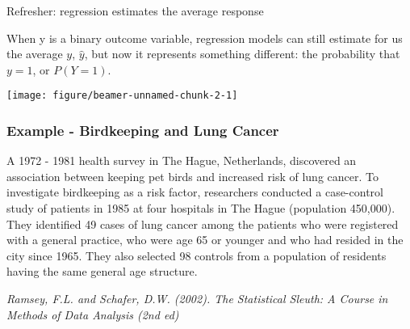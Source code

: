 \documentclass[table]{beamer}\usepackage[]{graphicx}\usepackage[]{color}
\makeatletter
\def\maxwidth{ %
  \ifdim\Gin@nat@width>\linewidth
    \linewidth
  \else
    \Gin@nat@width
  \fi
}
\newenvironment{knitrout}{}{} %
\makeatother
\begin{document}

\begin{frame}[fragile]{Refresher: regression estimates the average response}

When y is a binary outcome variable, regression models can still estimate for us the average $y$, $\hat y$, but now it represents something different: the probability that $y = 1$, or $P(Y=1)$.

\begin{knitrout}\scriptsize
{}\color{fgcolor}

{\centering \texttt{[image: figure/beamer-unnamed-chunk-2-1]} 

}



\end{knitrout}

\end{frame}



\begin{frame}
\frametitle{Example - Birdkeeping and Lung Cancer}

A 1972 - 1981 health survey in The Hague, Netherlands, discovered an association between keeping pet birds and increased risk of lung cancer. To investigate birdkeeping as a risk factor, researchers conducted a case-control study of patients in 1985 at four hospitals in The Hague (population 450,000). They identified 49 cases of lung cancer among the patients who were registered with a general practice, who were age 65 or younger and who had resided in the city since 1965. They also selected 98 controls from a population of residents having the same general age structure.


\vfill

{\tiny \textit{Ramsey, F.L. and Schafer, D.W. (2002). The Statistical Sleuth: A Course in Methods of Data Analysis (2nd ed)}}
\end{frame}

\end{document}
